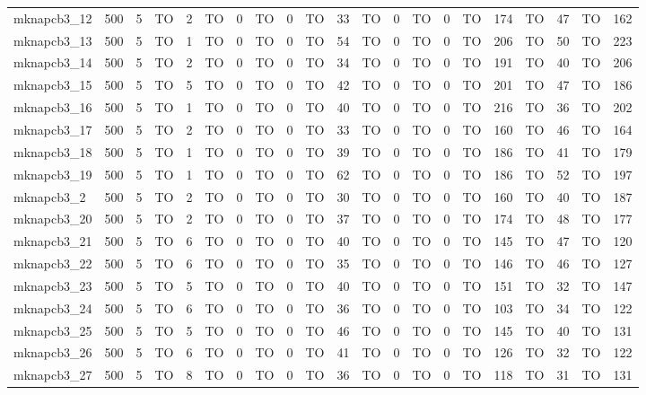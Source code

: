 \begin{sidewaystable}[!ht]
{\begin{tabular}{lcccccccccccccccccccc}
mknapcb3\_12 & 500 & 5 & TO & 2 & TO & 0 & TO & 0 & TO & 33 & TO & 0 & TO & 0 & TO & 174 & TO & 47 & TO & 162 \\
mknapcb3\_13 & 500 & 5 & TO & 1 & TO & 0 & TO & 0 & TO & 54 & TO & 0 & TO & 0 & TO & 206 & TO & 50 & TO & 223 \\
mknapcb3\_14 & 500 & 5 & TO & 2 & TO & 0 & TO & 0 & TO & 34 & TO & 0 & TO & 0 & TO & 191 & TO & 40 & TO & 206 \\
mknapcb3\_15 & 500 & 5 & TO & 5 & TO & 0 & TO & 0 & TO & 42 & TO & 0 & TO & 0 & TO & 201 & TO & 47 & TO & 186 \\
mknapcb3\_16 & 500 & 5 & TO & 1 & TO & 0 & TO & 0 & TO & 40 & TO & 0 & TO & 0 & TO & 216 & TO & 36 & TO & 202 \\
mknapcb3\_17 & 500 & 5 & TO & 2 & TO & 0 & TO & 0 & TO & 33 & TO & 0 & TO & 0 & TO & 160 & TO & 46 & TO & 164 \\
mknapcb3\_18 & 500 & 5 & TO & 1 & TO & 0 & TO & 0 & TO & 39 & TO & 0 & TO & 0 & TO & 186 & TO & 41 & TO & 179 \\
mknapcb3\_19 & 500 & 5 & TO & 1 & TO & 0 & TO & 0 & TO & 62 & TO & 0 & TO & 0 & TO & 186 & TO & 52 & TO & 197 \\
mknapcb3\_2 & 500 & 5 & TO & 2 & TO & 0 & TO & 0 & TO & 30 & TO & 0 & TO & 0 & TO & 160 & TO & 40 & TO & 187 \\
mknapcb3\_20 & 500 & 5 & TO & 2 & TO & 0 & TO & 0 & TO & 37 & TO & 0 & TO & 0 & TO & 174 & TO & 48 & TO & 177 \\
mknapcb3\_21 & 500 & 5 & TO & 6 & TO & 0 & TO & 0 & TO & 40 & TO & 0 & TO & 0 & TO & 145 & TO & 47 & TO & 120 \\
mknapcb3\_22 & 500 & 5 & TO & 6 & TO & 0 & TO & 0 & TO & 35 & TO & 0 & TO & 0 & TO & 146 & TO & 46 & TO & 127 \\
mknapcb3\_23 & 500 & 5 & TO & 5 & TO & 0 & TO & 0 & TO & 40 & TO & 0 & TO & 0 & TO & 151 & TO & 32 & TO & 147 \\
mknapcb3\_24 & 500 & 5 & TO & 6 & TO & 0 & TO & 0 & TO & 36 & TO & 0 & TO & 0 & TO & 103 & TO & 34 & TO & 122 \\
mknapcb3\_25 & 500 & 5 & TO & 5 & TO & 0 & TO & 0 & TO & 46 & TO & 0 & TO & 0 & TO & 145 & TO & 40 & TO & 131 \\
mknapcb3\_26 & 500 & 5 & TO & 6 & TO & 0 & TO & 0 & TO & 41 & TO & 0 & TO & 0 & TO & 126 & TO & 32 & TO & 122 \\
mknapcb3\_27 & 500 & 5 & TO & 8 & TO & 0 & TO & 0 & TO & 36 & TO & 0 & TO & 0 & TO & 118 & TO & 31 & TO & 131 \\

\end{tabular}}
\end{sidewaystable}
